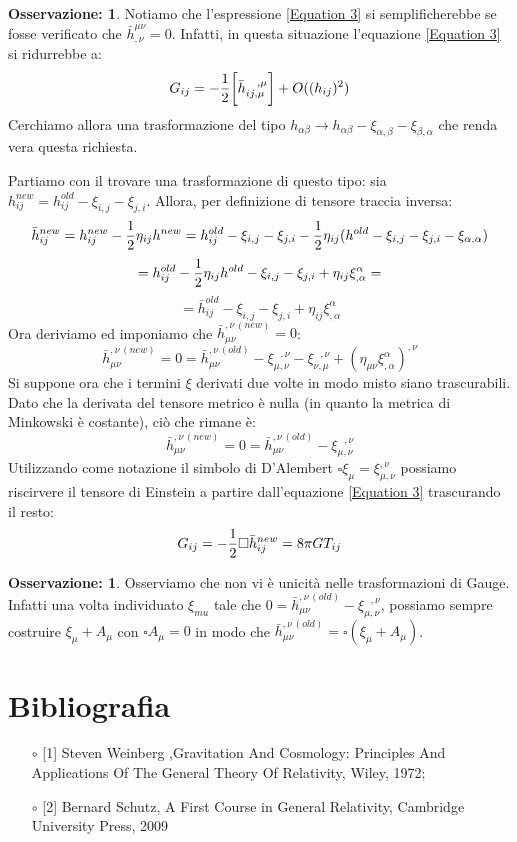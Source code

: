 \documentclass[]{report}
\theoremstyle{definition}
\theoremstyle{Theorem}
\theoremstyle{definition}
\theoremstyle{definition}
\theoremstyle{definition}
\newtheorem{Obs}[Def]{Osservazione:}
\begin{document}
\begin{Obs}
	Notiamo che l'espressione \ref{Equation 3} si semplificherebbe se fosse verificato che $\bar{h}^{\mu\nu}_{,\nu}=0$. Infatti, in questa situazione l'equazione \ref{Equation 3} si ridurrebbe a:
	$$	G_{ij}=-{1\over 2}\bigg[\bar{h}_{ij,\mu}^{\hspace{8pt},\mu}\bigg]+O((h_{ij})^2)$$ 
	Cerchiamo allora una trasformazione del tipo $h_{\alpha\beta}\rightarrow h_{\alpha\beta}-\xi_{\alpha,\beta}-\xi_{\beta,\alpha}$ che renda vera questa richiesta.		
\end{Obs}
Partiamo con il trovare una trasformazione di questo tipo: sia $h_{ij}^{new}=h_{ij}^{old}-\xi_{i,j}-\xi_{j,i}$. Allora, per definizione di tensore traccia inversa:
$$\bar{h}_{ij}^{new}=h_{ij}^{new}-{1\over 2}\eta_{ij}h^{new}=h_{ij}^{old}-\xi_{i,j}-\xi_{j,i}-{1\over 2}\eta_{ij}(h^{old}-\xi_{i,j}-\xi_{j,i}-\xi_{\alpha,\alpha})$$
$$=h_{ij}^{old}-{1\over 2}\eta_{ij}h^{old}-\xi_{i,j}-\xi_{j,i}+\eta_{ij}\xi_{,\alpha}^\alpha=$$
$$=\bar{h}_{ij}^{old}-\xi_{i,j}-\xi_{j,i}+\eta_{ij}\xi_{,\alpha}^\alpha$$
Ora deriviamo ed imponiamo che $\bar{h}_{\mu\nu}^{,\nu \, (new)}=0$:
$$\bar{h}_{\mu\nu}^{,\nu \, (new)}=0=\bar{h}_{\mu\nu}^{,\nu \, (old)}-\xi_{\mu,\nu}^{\hspace{8pt},\nu}-\xi_{\nu,\mu}^{\hspace{8pt},\nu}+(\eta_{\mu \nu}\xi_{,\alpha}^\alpha)^{,\nu}$$
Si suppone ora che i termini $\xi$ derivati due volte in modo misto siano trascurabili. Dato che la derivata del tensore metrico è nulla (in quanto la metrica di Minkowski è costante), ciò che rimane è:
$$\bar{h}_{\mu\nu}^{,\nu \, (new)}=0=\bar{h}_{\mu\nu}^{,\nu \, (old)}-\xi_{\mu,\nu}^{\hspace{8pt},\nu}$$
Utilizzando come notazione il simbolo di D'Alembert $\square\xi_\mu=\xi_{\mu,\nu}^{,\nu}$ possiamo riscirvere il tensore di Einstein a partire dall'equazione \ref{Equation 3} trascurando il resto:
$$G_{ij}=-{1\over 2}\square \bar{h}_{ij}^{new}=8\pi G T_{ij}$$
\begin{Obs}
	Osserviamo che non vi è unicità nelle trasformazioni di Gauge. Infatti una volta individuato $\xi_{mu}$ tale che $0=\bar{h}_{\mu\nu}^{,\nu \, (old)}-\xi_{\mu,\nu}^{\hspace{8pt},\nu}$, possiamo sempre costruire $\xi_\mu+A_\mu$ con $\square A_{\mu}=0$ in modo che $\bar{h}_{\mu\nu}^{,\nu \, (old)}=\square(\xi_\mu+A_\mu)$.
\end{Obs}

\chapter*{Bibliografia}
\begin{itemize}
	\item[$\circ$] [1] Steven Weinberg ,Gravitation And Cosmology: Principles And Applications Of The General Theory Of Relativity, Wiley, 1972; 
	\item[$\circ$] [2] Bernard Schutz, A First Course in General Relativity, Cambridge University Press, 2009
\end{itemize}
\end{document}
